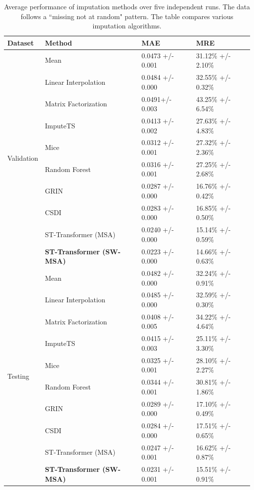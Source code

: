 \documentclass[11pt]{article}
\begin{document}
\begin{table}[h!]
    \centering
    \begin{tabularx}{\textwidth}{llXX}
        \toprule
        Dataset & Method & MAE & MRE \\
        \midrule
        \multirow{10}{*}{Validation}&
        Mean & 0.0473 +/- 0.001& 31.12\% +/- 2.10\%  \\
        &Linear Interpolation & 0.0484 +/- 0.000 & 32.55\% +/- 0.32\%\\
        &Matrix Factorization & 0.0491+/- 0.003 & 43.25\% +/- 6.54\% \\
        &ImputeTS & 0.0413 +/- 0.002 & 27.63\% +/- 4.83\% \\
        &Mice & 0.0312 +/- 0.001& 27.32\% +/- 2.36\% \\
        &Random Forest &  0.0316 +/- 0.001&  27.25\% +/- 2.68\%\\
        &GRIN & 0.0287 +/- 0.000 & 16.76\% +/- 0.42\%\\
        &CSDI & 0.0283 +/- 0.000 &16.85\% +/- 0.50\%\\
        &ST-Transformer (MSA) & 0.0240 +/- 0.000 & 15.14\% +/- 0.59\%\\
        &\textbf{ST-Transformer (SW-MSA)} & 0.0223 +/- 0.000 & 14.66\% +/- 0.63\%\\
        
        \midrule
        \multirow{10}{*}{Testing}&Mean & 0.0482 +/- 0.000 & 32.24\% +/- 0.91\%  \\
        &Linear Interpolation & 0.0485 +/- 0.000& 32.59\% +/- 0.30\%\\
        &Matrix Factorization & 0.0408 +/- 0.005& 34.22\% +/- 4.64\% \\
        &ImputeTS & 0.0415 +/- 0.003 & 25.11\% +/- 3.30\% \\
        &Mice & 0.0325 +/- 0.001& 28.10\% +/- 2.27\% \\
        &Random Forest &  0.0344 +/- 0.001&  30.81\% +/- 1.86\%\\
        &GRIN & 0.0289 +/- 0.000 & 17.10\% +/- 0.49\%\\
        &CSDI & 0.0284 +/- 0.000 &17.51\% +/- 0.65\%\\
        &ST-Transformer (MSA) & 0.0247 +/- 0.001 & 16.62\% +/- 0.87\%\\

        &\textbf{ST-Transformer (SW-MSA)} & 0.0231 +/- 0.001 & 15.51\% +/- 0.91\%\\
        \bottomrule
        

    \end{tabularx}
    \caption{Average performance of imputation methods over five independent runs. The data follows a ``missing not at random" pattern. The table compares various imputation algorithms.}
    \label{tab: missing at time points}
\end{table}
\end{document}

